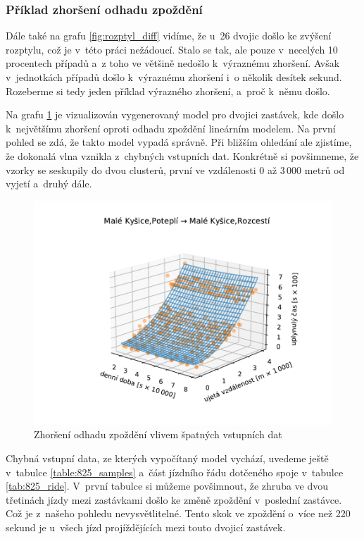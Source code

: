 \subsubsection{Příklad zhoršení odhadu zpoždění}

Dále také na grafu \ref{fig:rozptyl_diff} vidíme, že u~26 dvojic došlo ke zvýšení rozptylu, což je v~této práci nežádoucí. Stalo se tak, ale pouze v~necelých 10 procentech případů a~z toho ve většině nedošlo k~výraznému zhoršení. Avšak v~jednotkách případů došlo k~výraznému zhoršení i~o několik desítek sekund. Rozeberme si tedy jeden příklad výrazného zhoršení, a~proč k~němu došlo.


\bigbreak

Na grafu \ref{fig:chyba} je vizualizován vygenerovaný model pro dvojici zastávek, kde došlo k~největšímu zhoršení oproti odhadu zpoždění lineárním modelem. Na první pohled se zdá, že takto model vypadá správně. Při bližším ohledání ale zjistíme, že dokonalá vlna vznikla z~chybných vstupních dat. Konkrétně si povšimneme, že vzorky se seskupily do dvou clusterů, první ve vzdálenosti 0 až 3\,000 metrů od vyjetí a~druhý dále.


\begin{figure}
   \centering
 \includegraphics[width=1\linewidth]{../img/808_809}
 \caption{Zhoršení odhadu zpoždění vlivem špatných vstupních dat}
 \label{fig:chyba}
\end{figure}


Chybná vstupní data, ze kterých vypočítaný model vychází, uvedeme ještě v~tabulce \ref{table:825_samples} a~část jízdního řádu dotčeného spoje v~tabulce \ref{tab:825_ride}. V~první tabulce si můžeme povšimnout, že zhruba ve dvou třetinách jízdy mezi zastávkami došlo ke změně zpoždění v~poslední zastávce. Což je z~našeho pohledu nevysvětlitelné. Tento skok ve zpoždění o~více než 220 sekund je u~všech jízd projíždějících mezi touto dvojicí zastávek.


